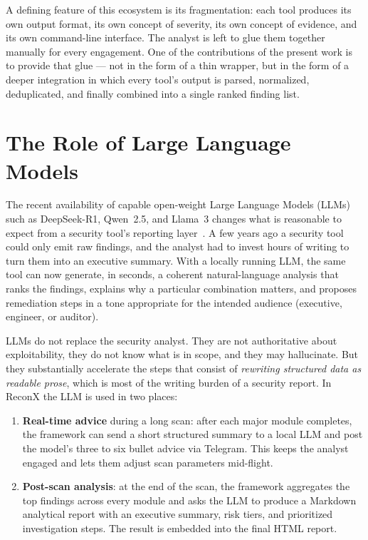 A defining feature of this ecosystem is its fragmentation: each tool produces its own output format, its own concept of severity, its own concept of evidence, and its own command-line interface. The analyst is left to glue them together manually for every engagement. One of the contributions of the present work is to provide that glue --- not in the form of a thin wrapper, but in the form of a deeper integration in which every tool's output is parsed, normalized, deduplicated, and finally combined into a single ranked finding list.

\section{The Role of Large Language Models}

The recent availability of capable open-weight Large Language Models (LLMs) such as DeepSeek-R1, Qwen~2.5, and Llama~3 changes what is reasonable to expect from a security tool's reporting layer~\cite{ollama, deepseek_r1}. A few years ago a security tool could only emit raw findings, and the analyst had to invest hours of writing to turn them into an executive summary. With a locally running LLM, the same tool can now generate, in seconds, a coherent natural-language analysis that ranks the findings, explains why a particular combination matters, and proposes remediation steps in a tone appropriate for the intended audience (executive, engineer, or auditor).

LLMs do not replace the security analyst. They are not authoritative about exploitability, they do not know what is in scope, and they may hallucinate. But they substantially accelerate the steps that consist of \textit{rewriting structured data as readable prose}, which is most of the writing burden of a security report. In ReconX the LLM is used in two places:

\begin{enumerate}
  \item \textbf{Real-time advice} during a long scan: after each major module completes, the framework can send a short structured summary to a local LLM and post the model's three to six bullet advice via Telegram. This keeps the analyst engaged and lets them adjust scan parameters mid-flight.
  \item \textbf{Post-scan analysis}: at the end of the scan, the framework aggregates the top findings across every module and asks the LLM to produce a Markdown analytical report with an executive summary, risk tiers, and prioritized investigation steps. The result is embedded into the final HTML report.
\end{enumerate}

